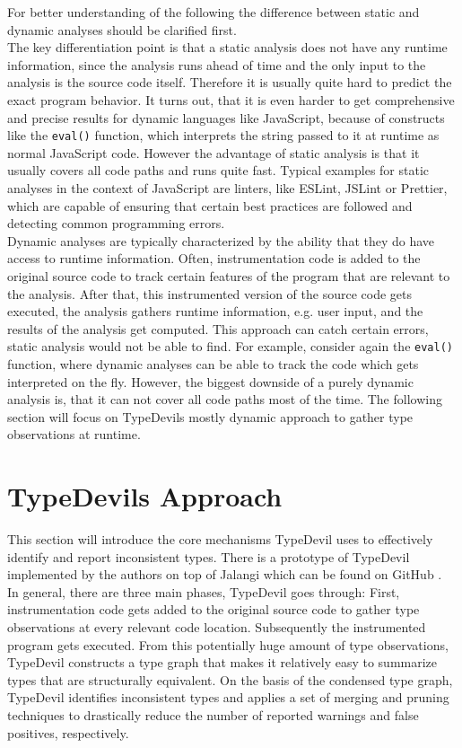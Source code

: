 \documentclass[runningheads,a4paper]{llncs}
\begin{document}
For better understanding of the following the difference between static and dynamic analyses should be clarified first.\\
The key differentiation point is that a static analysis does not have any runtime information, since the analysis runs ahead of time and the only input to the analysis is the source code itself.
Therefore it is usually quite hard to predict the exact program behavior.
It turns out, that it is even harder to get comprehensive and precise results for dynamic languages like JavaScript, because of constructs like the \lstinline[columns=fixed]{eval()} function, which interprets the string passed to it at runtime as normal JavaScript code. 
However the advantage of static analysis is that it usually covers all code paths and runs quite fast.
Typical examples for static analyses in the context of JavaScript are linters, like ESLint, JSLint or Prettier, which are capable of ensuring that certain best practices are followed and detecting common programming errors. \\
Dynamic analyses are typically characterized by the ability that they do have access to runtime information.
Often, instrumentation code is added to the original source code to track certain features of the program that are relevant to the analysis.
After that, this instrumented version of the source code gets executed, the analysis gathers runtime information, e.g. user input, and the results of the analysis get computed.
This approach can catch certain errors, static analysis would not be able to find.
For example, consider again the \lstinline[columns=fixed]{eval()} function, where dynamic analyses can be able to track the code which gets interpreted on the fly.
However, the biggest downside of a purely dynamic analysis is, that it can not cover all code paths most of the time.
The following section will focus on TypeDevils mostly dynamic approach to gather type observations at runtime.

\section{TypeDevils Approach}

This section will introduce the core mechanisms TypeDevil uses to effectively identify and report inconsistent types.
There is a prototype of TypeDevil implemented by the authors on top of Jalangi \cite{DBLP:conf/sigsoft/SenKBG13a} which can be found on GitHub \cite{TypeDevilGitHub}.\\
In general, there are three main phases, TypeDevil goes through: 
First, instrumentation code gets added to the original source code to gather type observations at every relevant code location.
Subsequently the instrumented program gets executed.
From this potentially huge amount of type observations, TypeDevil constructs a type graph that makes it relatively easy to summarize types that are structurally equivalent.
On the basis of the condensed type graph, TypeDevil identifies inconsistent types and applies a set of merging and pruning techniques to drastically reduce the number of reported warnings and false positives, respectively.
\end{document}
